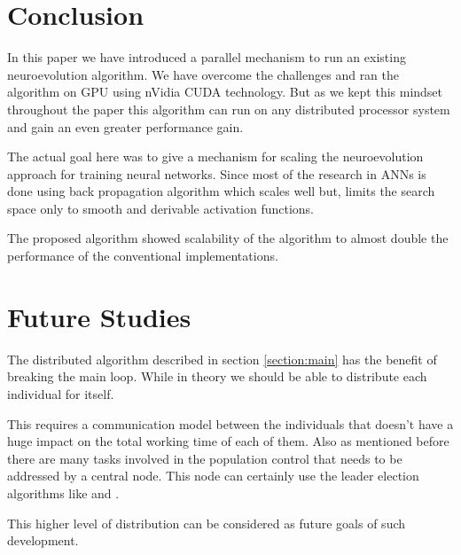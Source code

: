 \documentclass[twocolumn]{article}
\begin{document}

\section{Conclusion}

In this paper we have introduced a parallel mechanism to run an existing neuroevolution algorithm. We have overcome the challenges and ran the algorithm on GPU using nVidia CUDA technology. But as we kept this mindset throughout the paper this algorithm can run on any distributed processor system and gain an even greater performance gain.

The actual goal here was to give a mechanism for scaling the neuroevolution approach for training neural networks. Since most of the research in ANNs is done using back propagation algorithm which scales well but, limits the search space only to smooth and derivable activation functions.

The proposed algorithm showed scalability of the algorithm to almost double the performance of the conventional implementations.


\section{Future Studies}

The distributed algorithm described in section \ref{section:main} has the benefit of breaking the main loop. While in theory we should be able to distribute each individual for itself.

This requires a communication model between the individuals that doesn't have a huge impact on the total working time of each of them. Also as mentioned before there are many tasks involved in the population control that needs to be addressed by a central node. This node can certainly use the leader election algorithms like \cite{LeaderElection1} and \cite{LeaderElection2}.

This higher level of distribution can be considered as future goals of such development.




\end{document}
